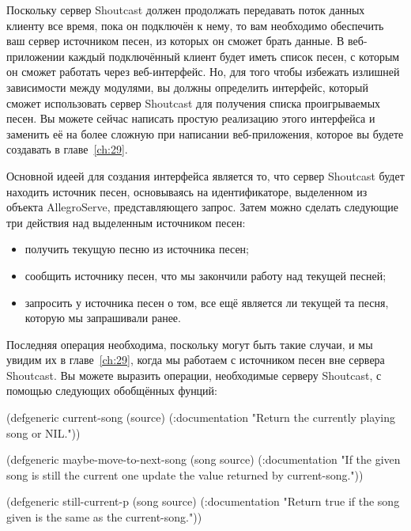 Поскольку сервер Shoutcast должен продолжать передавать поток данных клиенту все время,
пока он подключён к нему, то вам необходимо обеспечить ваш сервер источником песен, из
которых он сможет брать данные.  В веб-приложении каждый подключённый клиент будет иметь
список песен, с которым он сможет работать через веб-интерфейс.  Но, для того чтобы
избежать излишней зависимости между модулями, вы должны определить интерфейс, который
сможет использовать сервер Shoutcast для получения списка проигрываемых песен. Вы можете
сейчас написать простую реализацию этого интерфейса и заменить её на более сложную при
написании веб-приложения, которое вы будете создавать в главе~\ref{ch:29}.


Основной идеей для создания интерфейса является то, что сервер Shoutcast будет находить
источник песен, основываясь на идентификаторе, выделенном из объекта AllegroServe,
представляющего запрос.  Затем можно сделать следующие три действия над выделенным
источником песен:
\begin{itemize}
\item получить текущую песню из источника песен;
\item сообщить источнику песен, что мы закончили работу над текущей песней;
\item запросить у источника песен о том, все ещё является ли текущей та песня, которую мы
  запрашивали ранее.
\end{itemize}

Последняя операция необходима, поскольку могут быть такие случаи, и мы увидим их в
главе~\ref{ch:29}, когда мы работаем с источником песен вне сервера Shoutcast.  Вы можете
выразить операции, необходимые серверу Shoutcast, с помощью следующих обобщённых фунций:

\begin{myverb}
(defgeneric current-song (source)
  (:documentation "Return the currently playing song or NIL."))

(defgeneric maybe-move-to-next-song (song source)
  (:documentation
   "If the given song is still the current one update the value
returned by current-song."))

(defgeneric still-current-p (song source)
  (:documentation
   "Return true if the song given is the same as the current-song."))
\end{myverb}

